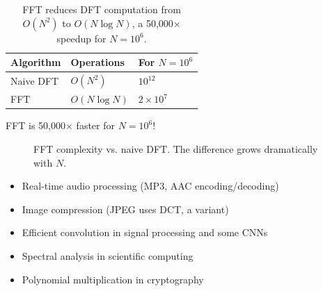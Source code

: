\begin{table}[ht]
\centering
\begin{tabular}{p{}p{}p{}}
\toprule
\textbf{Algorithm} & \textbf{Operations} & \textbf{For $N = 10^6$} \\
\midrule
Naive DFT & $O(N^2)$ & $10^{12}$ \\
FFT & $O(N \log N)$ & $2 \times 10^7$ \\
\bottomrule
\end{tabular}
\vspace{2em}
\caption{FFT reduces DFT computation from $O(N^2)$ to $O(N \log N)$, a 50,000$\times$ speedup for $N = 10^6$.}
\label{tab:fft_complexity}
\end{table}

FFT is 50,000$\times$ faster for $N = 10^6$!

\begin{figure}[h]
    \centering
    \caption{FFT complexity vs. naive DFT. The difference grows dramatically with $N$.}
    \label{fig:fft_complexity}
\end{figure}

\begin{itemize}
    \item Real-time audio processing (MP3, AAC encoding/decoding)
    \item Image compression (JPEG uses DCT, a variant)
    \item Efficient convolution in signal processing and some CNNs
    \item Spectral analysis in scientific computing
    \item Polynomial multiplication in cryptography
\end{itemize}




